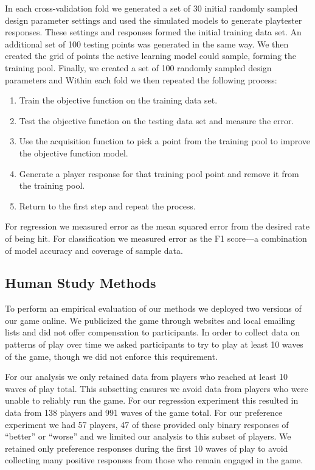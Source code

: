 \documentclass{sig-alternate}
\begin{document}
In each cross-validation fold we generated a set of 30 initial randomly sampled design parameter settings and used the simulated models to generate playtester responses.
These settings and responses formed the initial training data set.
An additional set of 100 testing points was generated in the same way.
We then created the grid of points the active learning model could sample, forming the training pool.
Finally, we created a set of 100 randomly sampled design parameters and 
Within each fold we then repeated the following process:
\begin{enumerate}
\item Train the objective function on the training data set.
\item Test the objective function on the testing data set and measure the error.
\item Use the acquisition function to pick a point from the training pool to improve the objective function model.
\item Generate a player response for that training pool point and remove it from the training pool.
\item Return to the first step and repeat the process.
\end{enumerate}
\noindent For regression we measured error as the mean squared error from the desired rate of being hit.
For classification we measured error as the F1 score---a combination of model accuracy and coverage of sample data.



\subsection{Human Study Methods}

To perform an empirical evaluation of our methods we deployed two versions of our game online.
We publicized the game through websites and local emailing lists and did not offer compensation to participants.
In order to collect data on patterns of play over time we asked participants to try to play at least 10 waves of the game, though we did not enforce this requirement.

For our analysis we only retained data from players who reached at least 10 waves of play total. %
This subsetting ensures we avoid data from players who were unable to reliably run the game.
For our regression experiment this resulted in data from 138 players and 991 waves of the game total.
For our preference experiment we had 57 players, 47 of these provided only binary responses of ``better'' or ``worse'' and we limited our analysis to this subset of players.
We retained only preference responses during the first 10 waves of play to avoid collecting many positive responses from those who remain engaged in the game.
\end{document}
